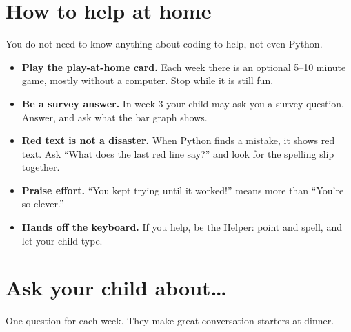 \documentclass[track=junior,level=3]{kidscode}
\begin{document}
\section{How to help at home}
You do not need to know anything about coding to help, not even Python.
\begin{itemize}[itemsep=3pt]
  \item \textbf{Play the play-at-home card.} Each week there is an optional 5--10 minute game, mostly
        without a computer. Stop while it is still fun.
  \item \textbf{Be a survey answer.} In week 3 your child may ask you a survey question. Answer, and
        ask what the bar graph shows.
  \item \textbf{Red text is not a disaster.} When Python finds a mistake, it shows red text. Ask
        \enquote{What does the last red line say?} and look for the spelling slip together.
  \item \textbf{Praise effort.} \enquote{You kept trying until it worked!} means more than
        \enquote{You're so clever.}
  \item \textbf{Hands off the keyboard.} If you help, be the Helper: point and spell, and let your child type.
\end{itemize}

\section{Ask your child about\dots}
One question for each week. They make great conversation starters at dinner.
\end{document}
